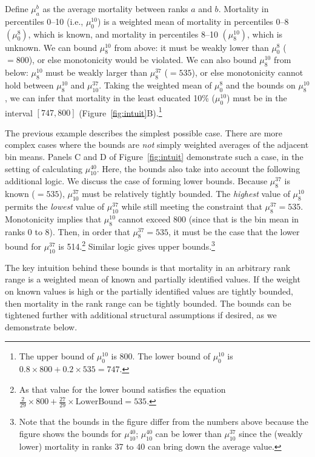 \documentclass[12pt,letterpaper]{article}
\numberwithin{equation}{section}
\begin{document}
Define $\mu_a^b$ as the average mortality between ranks
$a$ and $b$. Mortality in percentiles 0--10 (i.e., $\mu_0^{10}$) is a weighted
mean of mortality in percentiles 0--8 $(\mu_0^{8})$, which is known,
and mortality in percentiles 8--10 $(\mu_8^{10})$, which is
unknown. We can bound $\mu_8^{10}$ from above: it must be weakly lower
than $\mu_0^{8}$ ($=800$), or else monotonicity would be violated. We can also bound $\mu_8^{10}$ from below: $\mu_8^{10}$ must be weakly larger than $\mu_8^{37}$ ($=535$), or else monotonicity cannot hold between $\mu_8^{10}$ and $\mu_{10}^{37}$. Taking the weighted mean of $\mu_0^{8}$ and the bounds on $\mu_8^{10}$, we can infer that mortality in the least educated 10\% ($\mu_0^{10}$) must be in the interval $[747, 800]$ (Figure~\ref{fig:intuit}B).\footnote{The upper bound of $\mu_0^{10}$ is 800. The lower bound of $\mu_0^{10}$ is $0.8 \times 800 + 0.2 \times 535 = 747$.}

The previous example describes the simplest possible case. There are more complex cases where the bounds are \textit{not} simply weighted averages of the adjacent bin means. Panels C and D of Figure~\ref{fig:intuit} demonstrate such a case, in the setting of calculating $\mu_{10}^{40}$. Here, the bounds also take into account the following additional logic. We discuss the case of forming lower bounds. Because $\mu_{8}^{37}$ is known ($= 535$), $\mu_{10}^{37}$ must be relatively tightly bounded. The \textit{highest} value of $\mu_8^{10}$ permits the \textit{lowest} value of $\mu_{10}^{37}$ while still meeting the constraint that $\mu_8^{37} = 535$. Monotonicity implies that $\mu_8^{10}$ cannot exceed 800 (since that is the bin mean in ranks 0 to 8). Then, in order that $\mu_8^{37} = 535$, it must be the case that the lower bound for $\mu_{10}^{37}$ is 514.\footnote{As that value for the lower bound satisfies the equation $\frac{2}{29} \times 800 + \frac{27}{29} \times \text{LowerBound} = 535.$} Similar logic gives upper bounds.\footnote{Note that the bounds in the figure differ from the numbers above because the figure shows the bounds for $\mu_{10}^{40}$; $\mu_{10}^{40}$ can be lower than $\mu_{10}^{37}$ since the (weakly lower) mortality in ranks 37 to 40 can bring down the average value.}

The key intuition behind these bounds is that mortality in an
arbitrary rank range is a weighted mean of known and partially
identified values. If the weight on known values is high or the
partially identified values are tightly bounded, then mortality in the
rank range can be tightly bounded. The bounds can be tightened further
with additional structural assumptions if
desired, as we demonstrate below. 
\end{document}

